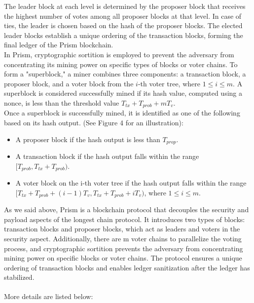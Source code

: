 The leader block at each level is determined by the proposer block that receives the highest number of votes among all proposer blocks at that level. In case of ties, the leader is chosen based on the hash of the proposer blocks. The elected leader blocks establish a unique ordering of the transaction blocks, forming the final ledger of the Prism blockchain.\\
In Prism, cryptographic sortition is employed to prevent the adversary from concentrating its mining power on specific types of blocks or voter chains. To form a "superblock," a miner combines three components: a transaction block, a proposer block, and a voter block from the $i$-th voter tree, where $1 ≤ i ≤ m$. A superblock is considered successfully mined if its hash value, computed using a nonce, is less than the threshold value $T_{tx} + T_{prob} + mT_{v}$.\\
Once a superblock is successfully mined, it is identified as one of the following based on its hash output. (See Figure 4 for an illustration):\\
\begin{itemize}
	\item A proposer block if the hash output is less than $T_{prop}$.
	\item A transaction block if the hash output falls within the range $[T_{prob}, T_{tx} + T_{prob})$.
	\item A voter block on the i-th voter tree if the hash output falls within the range $[T_{tx} + T_{prob} + (i − 1)T_{v}, T_{tx} + T_{prob} + iT_{v})$, where $1 ≤ i ≤ m$.
\end{itemize}
As we said above, Prism is a blockchain protocol that decouples the security and payload aspects of the longest chain protocol. It introduces two types of blocks: transaction blocks and proposer blocks, which act as leaders and voters in the security aspect. Additionally, there are m voter chains to parallelize the voting process, and cryptographic sortition prevents the adversary from concentrating mining power on specific blocks or voter chains. The protocol ensures a unique ordering of transaction blocks and enables ledger sanitization after the ledger has stabilized.\\
\\
More details are listed below:
\\

